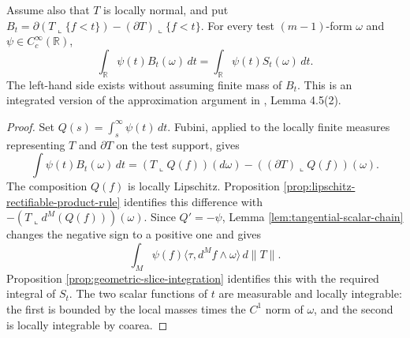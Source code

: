 \begin{lemma}\label{lem:integrated-distributional-slice}
Assume also that $T$ is locally normal, and put $B_t=\partial(T\llcorner\{f<t\})-(\partial T)\llcorner\{f<t\}$. For every test $(m-1)$-form $\omega$ and $\psi\in C_c^\infty(\mathbb R)$,
\[
 \int_{\mathbb R}\psi(t)B_t(\omega)\,dt
 =\int_{\mathbb R}\psi(t)S_t(\omega)\,dt.
\]
The left-hand side exists without assuming finite mass of $B_t$. This is an integrated version of the approximation argument in \cite{Sim18}, Lemma 4.5(2).
\end{lemma}
\begin{proof}
Set $Q(s)=\int_s^\infty\psi(t)\,dt$. Fubini, applied to the locally finite measures representing $T$ and $\partial T$ on the test support, gives
\[
 \int\psi(t)B_t(\omega)\,dt
 =(T\llcorner Q(f))(d\omega)
       -((\partial T)\llcorner Q(f))(\omega).
\]
The composition $Q(f)$ is locally Lipschitz. Proposition \ref{prop:lipschitz-rectifiable-product-rule} identifies this difference with $-(T\llcorner d^M(Q(f)))(\omega)$. Since $Q'=-\psi$, Lemma \ref{lem:tangential-scalar-chain} changes the negative sign to a positive one and gives
\[
 \int_M\psi(f)\langle\tau,d^Mf\wedge\omega\rangle\,d\|T\|.
\]
Proposition \ref{prop:geometric-slice-integration} identifies this with the required integral of $S_t$. The two scalar functions of $t$ are measurable and locally integrable: the first is bounded by the local masses times the $C^1$ norm of $\omega$, and the second is locally integrable by coarea.
\end{proof}

